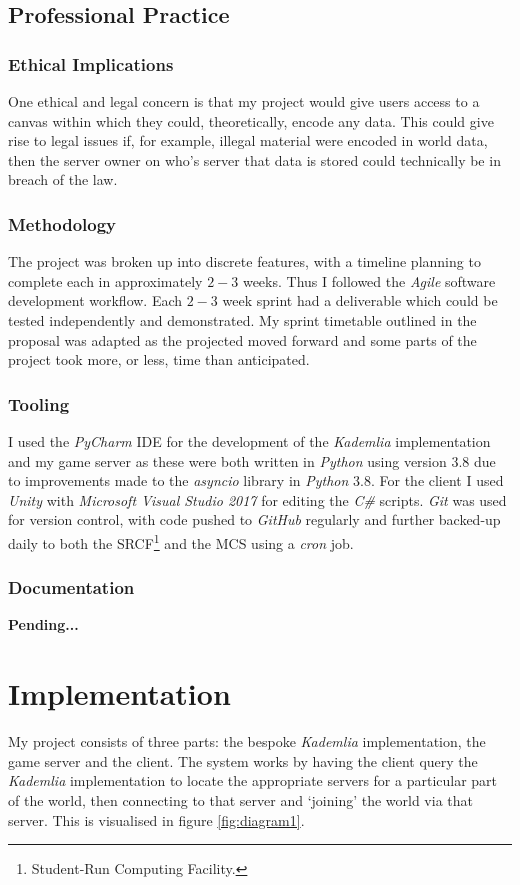\documentclass[10pt,twoside,notitlepage,a4paper]{report}
\newcommand{\python}{\emph{Python}}
\newcommand{\unity}{\emph{Unity}}
\newcommand{\kademlia}{\emph{Kademlia}}
\begin{document}
	\section{Professional Practice}
	\subsection{Ethical Implications} %
	One ethical and legal concern is that my project would give users access to a canvas within which they could, theoretically, encode any data. This could give rise to legal issues if, for example, illegal material were encoded in world data, then the server owner on who's server that data is stored could technically be in breach of the law.
	
	\subsection{Methodology}
	The project was broken up into discrete features, with a timeline planning to complete each in approximately $2-3$ weeks. Thus I followed the \emph{Agile} software development workflow. Each $2-3$ week sprint had a deliverable which could be tested independently and demonstrated. My sprint timetable outlined in the proposal was adapted as the projected moved forward and some parts of the project took more, or less, time than anticipated.
	
	
	\subsection{Tooling}
	I used the \emph{PyCharm} IDE for the development of the \kademlia{} implementation and my game server as these were both written in \python{} using version $3.8$ due to improvements made to the \emph{asyncio} library in \python{} $3.8$. For the client I used \unity{} with \emph{Microsoft Visual Studio 2017} for editing the \emph{C\#} scripts. \emph{Git} was used for version control, with code pushed to \emph{GitHub} regularly and further backed-up daily to both the SRCF\footnote{Student-Run Computing Facility.} and the MCS using a \emph{cron} job.
	
	\subsection{Documentation}
	\textbf{Pending...}	
	
	\cleardoublepage
	\chapter{Implementation}
	My project consists of three parts: the bespoke \kademlia{} implementation, the game server and the client. The system works by having the client query the \kademlia{} implementation to locate the appropriate servers for a particular part of the world, then connecting to that server and `joining' the world via that server. This is visualised in figure \ref{fig:diagram1}.
	
\end{document}
